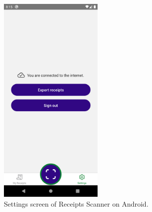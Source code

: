 \documentclass[
  digital, %
  table,   %
  oneside, %
  lof,     %
  lot,     %
]{fithesis3}
\newcommand\half{0.45}
\begin{document}
\begin{figure}[H]
    \begin{center}
        \includegraphics[width=\half\textwidth]{figures/screens/android/light/settings_screen}
    \end{center}
    \caption{Settings screen of Receipts Scanner on Android.}
    \label{fig:settings_screen}
\end{figure}
\end{document}
